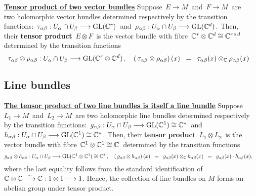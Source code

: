 \vskip0.5cm
\noindent
\underline{\textbf{Tensor product of two vector bundles}}
\vskip 0.1cm
\noindent
Suppose
\,$E \longrightarrow M$\, and \,$F \longrightarrow M$\,
are two holomorphic vector bundles
determined respectively by the transition functions:
\,$\tau_{\alpha\beta} : U_{\alpha} \cap U_{\beta} \longrightarrow \textnormal{GL}(\mathbb{C}^{r})$\,
and
\,$\rho_{\alpha\beta} : U_{\alpha} \cap U_{\beta} \longrightarrow \textnormal{GL}(\mathbb{C}^{d})$.\,
Then, their \textbf{tensor product}
\,$E \otimes F$\,
is the vector bundle with fibre
\,$\mathbb{C}^{r}\otimes\mathbb{C}^{d} \cong \mathbb{C}^{r \times d}$\,
determined by the transition functions
\begin{equation*}
\tau_{\alpha\beta} \otimes \rho_{\alpha\beta} : U_{\alpha} \cap U_{\beta} \longrightarrow \textnormal{GL}(\mathbb{C}^{r} \otimes \mathbb{C}^{d})\,,
\quad
\left(\,\tau_{\alpha\beta} \otimes \rho_{\alpha\beta}\right)(x)
\;\; = \;\;
	\tau_{\alpha\beta}(x) \otimes_{\mathbb{C}} \rho_{\alpha\beta}(x)
\end{equation*}


\vskip0.5cm
\subsection{Line bundles}

\noindent
\underline{\textbf{The tensor product of two line bundles is itself a line bundle}}
\vskip 0.1cm
\noindent
Suppose
\,$L_{1} \longrightarrow M$\, and \,$L_{2} \longrightarrow M$\,
are two holomorphic line bundles
determined respectively by the transition functions:
\,$g_{\alpha\beta} : U_{\alpha} \cap U_{\beta} \longrightarrow \textnormal{GL}(\mathbb{C}^{1}) \cong \mathbb{C}^{*}$\,
and
\,$h_{\alpha\beta} : U_{\alpha} \cap U_{\beta} \longrightarrow \textnormal{GL}(\mathbb{C}^{1}) \cong \mathbb{C}^{*}$.\,
Then, their \textbf{tensor product}
\,$L_{1} \otimes L_{2}$\,
is the vector bundle with fibre
\,$\mathbb{C}^{1} \otimes \mathbb{C}^{1} \cong \mathbb{C}$\,
determined by the transition functions
\begin{equation*}
g_{\alpha\beta} \otimes h_{\alpha\beta} : U_{\alpha} \cap U_{\beta} \longrightarrow \textnormal{GL}(\mathbb{C}^{1} \otimes \mathbb{C}^{1}) \cong \mathbb{C}^{*}\,,
\quad
\left(\,g_{\alpha\beta} \otimes h_{\alpha\beta}\right)(x)
\;\; = \;\;
	g_{\alpha\beta}(x) \otimes_{\mathbb{C}} h_{\alpha\beta}(x)
\;\; = \;\;
	g_{\alpha\beta}(x) \cdot h_{\alpha\beta}(x),
\end{equation*}
where the last equality follows from the standard identification
of $\mathbb{C} \otimes \mathbb{C} \overset{\sim}{\longrightarrow} \mathbb{C} : 1 \otimes 1 \longmapsto 1$.
\vskip 0.2cm
\noindent
Hence, the collection of line bundles on $M$ forms an abelian group under tensor product.

